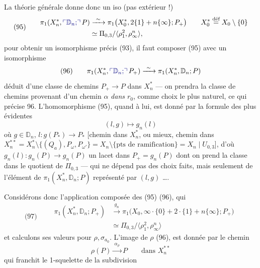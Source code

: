 \documentclass[11pt,a4paper]{article}
\begin{document}
La théorie générale donne donc un iso (pas extérieur !)
\[
  \text{(95)}\qquad
  \begin{aligned}
    \pi_1(X_n^*, \text{\add{$\mathbb{D}_n;$}}\, P) &\xrightarrow{\ \sim\ } \pi_1\bigl(X_0^*, 2\{1\} + n\{\infty\} ; P_+\bigr) \qquad X_0^* \overset{\text{déf}}{=} X_0 \setminus \{0\} \\
    &\simeq \Pi_{0,3}/\langle \rho_1^2, \rho_\infty^n \rangle ,
  \end{aligned}
\]
pour obtenir un isomorphisme précis (93), il faut composer (95) avec un isomorphisme
\[
  \text{(96)}\qquad \pi_1(X_n^*, \text{\add{$\mathbb{D}_n;$}}\, P_+) \xrightarrow{\ \sim\ } \pi_1(X_n^*, \mathbb{D}_n ; P)
\]
déduit d'une classe de chemins $P_+ \to P$ dans $X_n^*$ — on prendra la  classe de chemins provenant d'un chemin $\alpha$ \emph{dans $r_0$}, comme choix le plus naturel, ce qui précise 96. L'homomorphisme (95), quand à lui, est donné par la formule des plus évidentes
\[
  (l, g) \longmapsto g_n(l)
\]
où $g \in \mathbb{D}_n$, $l : g(P_*) \to P_*$ [chemin dans $X_n^*$, ou mieux, chemin dans $X_n^{**} = X_n^* \setminus \{(Q_a), P_\omega, P_{\omega'}\} = X_n \setminus \{\text{pts de ramification}\} = X_n \mid U_{0,3}$], d'où $g_n(l) : g_n(P) \to g_n(P)$ un lacet dans $P_+ = g_n(P)$ dont on prend la classe dans le quotient de $\Pi_{0,3}$ — qui ne dépend pas des choix faits, mais seulement de l'élément de $\pi_1(X_n^*, \mathbb{D}_n ; P)$ représenté par $(l, g)$ ….

Considérons donc l'application  composée des (95) (96), qui
\[
  \text{(97)}\qquad
  \begin{aligned}
    \pi_1(X_n^*, \mathbb{D}_n ; P_+) &\xrightarrow{\ g_n\ } \pi_1\bigl(X_0, \infty\cdot\{0\} + 2\cdot\{1\} + n\{\infty\} ; P_+\bigr) \\
    &\simeq \Pi_{0,3}/\langle \rho_1^2, \rho_\infty^n \rangle
  \end{aligned}
\]
et calculons ses valeurs pour $\rho, \sigma_{a_0}$. L'image de $\rho$  (96), est donnée par le chemin
\[
  \rho(P) \xrightarrow{\ \alpha_\rho\ } P \qquad \text{dans } X_n^{**}
\]
qui franchit le 1-squelette de la subdivision
\end{document}
